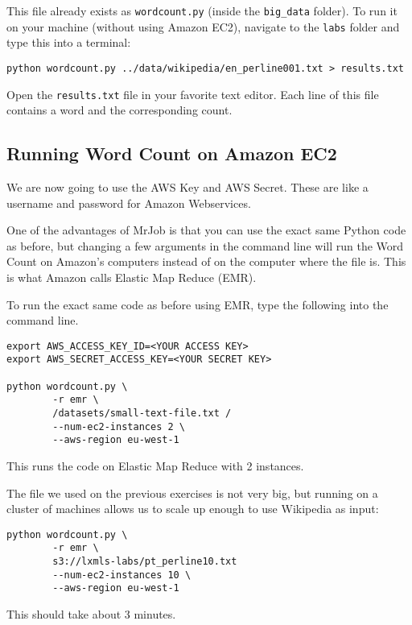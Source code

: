 This file already exists as \texttt{wordcount.py} (inside the \texttt{big\_data} folder). To run it on your machine (without using Amazon EC2), navigate to the \texttt{labs} folder and type this into a terminal:

\begin{verbatim}
python wordcount.py ../data/wikipedia/en_perline001.txt > results.txt
\end{verbatim}

Open the \texttt{results.txt} file in your favorite text editor. Each line of this file contains a word and the corresponding count.

\subsection{Running Word Count on Amazon EC2}

We are now going to use the AWS Key and AWS Secret. These are like a username
and password for Amazon Webservices.

One of the advantages of MrJob is that you can use the exact same Python code as before, but changing a few arguments in the command line will run the Word Count on Amazon's computers instead of on the computer where the file is. This is what Amazon calls Elastic Map Reduce (EMR).

To run the exact same code as before using EMR, type the following into the command line.

\begin{verbatim}
export AWS_ACCESS_KEY_ID=<YOUR ACCESS KEY>
export AWS_SECRET_ACCESS_KEY=<YOUR SECRET KEY>

python wordcount.py \
        -r emr \
        /datasets/small-text-file.txt /
        --num-ec2-instances 2 \
        --aws-region eu-west-1
\end{verbatim}

This runs the code on Elastic Map Reduce with 2 instances.

The file we used on the previous exercises is not very big, but running on a cluster of machines allows us to
scale up enough to use Wikipedia as input:

\begin{verbatim}
python wordcount.py \
        -r emr \
        s3://lxmls-labs/pt_perline10.txt
        --num-ec2-instances 10 \
        --aws-region eu-west-1
\end{verbatim}

This should take about 3 minutes.

